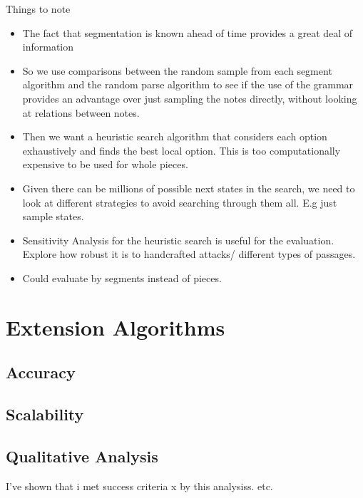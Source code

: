 \documentclass[12pt,a4paper,twoside,openright]{report} \usepackage[pdfborder={0 0 0}]{hyperref}    %
\theoremstyle{definition} \newtheorem{definition}{Definition}[section]
\begin{document}
  Things to note \begin{itemize} \item The fact that segmentation is known ahead of time provides a great deal of
    information \cite{gothamWhatIfWhen2021} \item So we use comparisons between the random sample from each segment
    algorithm and the random parse algorithm to see if the use of the grammar provides an advantage over just sampling
    the notes directly, without looking at relations between notes. \item Then we want a heuristic search algorithm that
    considers each option exhaustively and finds the best local option. This is too computationally expensive to be used
    for whole pieces. \item Given there can be millions of possible next states in the search, we need to look at
    different strategies to avoid searching through them all. E.g just sample states. \item Sensitivity Analysis for the
heuristic search is useful for the evaluation. Explore how robust it is to handcrafted attacks/ different types of
passages. \item Could evaluate by segments instead of pieces. \end{itemize}

\section{Extension Algorithms}

\subsection{Accuracy}

\subsection{Scalability}

\subsection{Qualitative Analysis}


I've shown that i met success criteria x by this analysiss. etc.
\end{document}
